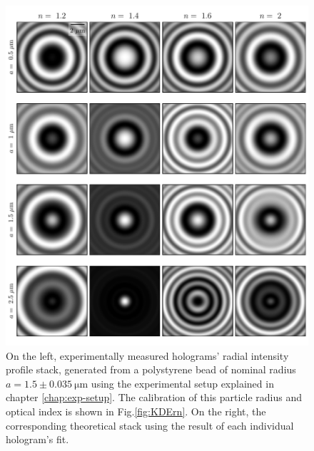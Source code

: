 \begin{figure}
	\centering
	\includegraphics{02_body/chapter2/images/holo_size_exemple/holos_fix_z.pdf}
	\caption{On the left, experimentally measured  holograms' radial intensity profile stack, generated from a polystyrene bead of nominal radius $a = 1.5 \pm 0.035 ~ \mathrm{\mu m} $ using the experimental setup explained in chapter \ref{chap:exp-setup}. The calibration of this particle radius and optical index is shown in Fig.\ref{fig:KDErn}. On the right, the corresponding theoretical stack using the result of each individual hologram's fit.}
	\label{fig:holo_fix_z}
\end{figure}



